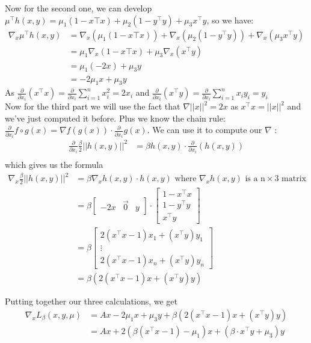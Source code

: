 \documentclass{article}
\newcommand{\tp}{^\top}
\newcommand{\p}{\frac{\partial}{\partial x_i}}
\begin{document}
Now for the second one, we can develop $\mu\tp h(x,y)=\mu_1 (1-x\top x)+\mu_2(1-y\tp y) + \mu_3 x\tp y$, so we have:
\begin{align*}
\nabla_x \mu\tp h(x,y)&=\nabla_x (\mu_1 (1-x\top x))+\nabla_x (\mu_2(1-y\tp y)) +\nabla_x ( \mu_3 x\tp y)\\
&=\mu_1 \nabla_x (1-x\top x) + \mu_3 \nabla_x ( x\tp y)\\
&= \mu_1 (-2x) + \mu_3 y\\
&= - 2\mu_1 x+\mu_3 y
\end{align*}
As $\p(x\tp x)=\p \sum_{i=1}^n x_i^2=2x_i$ and  $\p(x\tp y)=\p \sum_{i=1}^n x_i y_i=y_i$\\

Now for the third part we will use the fact that $\nabla||x||^2=2x$ as $x\tp x=||x||^2$ and we've just computed it before. Plus we know the chain rule: $\p f\circ g(x)= \nabla f (g(x)) \cdot \p g(x)$. We can use it to compute our $\nabla$ :
\begin{align*}
\p \frac{\beta}{2} ||h(x,y)||^2&=\beta h(x,y) \cdot \p(h(x,y))\\
\end{align*}
which gives us the formula
\begin{align*}
\nabla_x \frac{\beta}{2} ||h(x,y)||^2&=\beta \nabla_x h(x,y) \cdot  h(x,y) \text{ where } \nabla_x h(x,y) \text{ is a n} \times \text{3 matrix}\\
&=\beta\begin{bmatrix} -2x & \vec 0 & y \end{bmatrix}   \cdot \begin{bmatrix} 1-x\tp x \\ 1-y\tp y\\ x\tp y \end{bmatrix} \\
&=\beta\begin{bmatrix}2(x\tp x-1) x_1+(x\tp y )y_1\\ \vdots \\ 2(x\tp x-1) x_n+(x\tp y )y_n \end{bmatrix}\\
&=\beta \left( 2(x\tp x-1)  x+(x\tp y ) y \right) 
\end{align*}

Putting together our three calculations, we get
\begin{align*}
\nabla_x L_\beta(x,y,\mu)&=Ax - 2\mu_1 x+\mu_3 y+\beta \left( 2(x\tp x-1) x+(x\tp y ) y \right) \\
&=Ax+ 2(\beta (x\tp x-1) - \mu_1) x +(\beta \cdot x\tp y + \mu_3)y
\end{align*}
\end{document}
